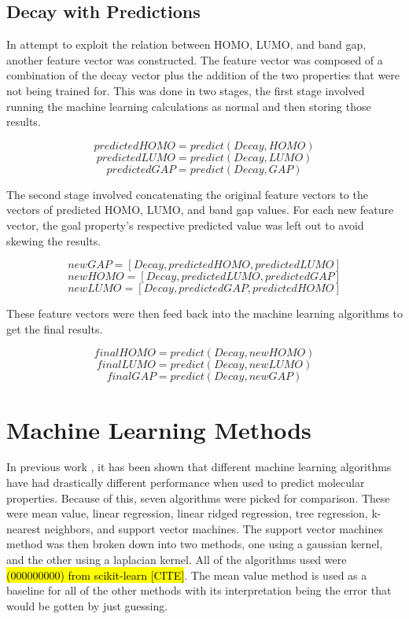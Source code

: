 \documentclass[10pt]{article}
\begin{document}
\subsection{Decay with Predictions}

In attempt to exploit the relation between HOMO, LUMO, and band gap, another feature vector was constructed. The feature vector was composed of a combination of the decay vector plus the addition of the two properties that were not being trained for. This was done in two stages, the first stage involved running the machine learning calculations as normal and then storing those results.

$$ predictedHOMO = predict(Decay, HOMO) $$
$$ predictedLUMO = predict(Decay, LUMO) $$
$$ predictedGAP = predict(Decay, GAP) $$

The second stage involved concatenating the original feature vectors to the vectors of predicted HOMO, LUMO, and band gap values. For each new feature vector, the goal property's respective predicted value was left out to avoid skewing the results.

$$ newGAP = [Decay, predictedHOMO, predictedLUMO] $$
$$ newHOMO = [Decay, predictedLUMO, predictedGAP] $$
$$ newLUMO = [Decay, predictedGAP, predictedHOMO] $$

These feature vectors were then feed back into the machine learning algorithms to get the final results.

$$ finalHOMO = predict(Decay, newHOMO) $$
$$ finalLUMO = predict(Decay, newLUMO) $$
$$ finalGAP = predict(Decay, newGAP) $$

\section{Machine Learning Methods}

In previous work \cite{montavon_machine_2013}, it has been shown that different machine learning algorithms have had drastically different performance when used to predict molecular properties. Because of this, seven algorithms were picked for comparison. These were mean value, linear regression, linear ridged regression, tree regression, k-nearest neighbors, and support vector machines. The support vector machines method was then broken down into two methods, one using a gaussian kernel, and the other using a laplacian kernel. All of the algorithms used were \hl{(000000000) from scikit-learn [CITE]}. The mean value method is used as a baseline for all of the other methods with its interpretation being the error that would be gotten by just guessing.
\end{document}
